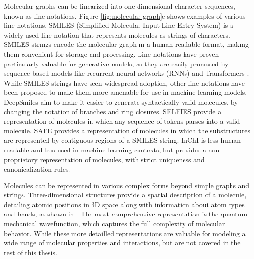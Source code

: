 Molecular graphs can be linearized into one-dimensional character sequences, known as line
notations. Figure \ref{fig:molecular-graph}c shows examples of various line notations. SMILES
(Simplified Molecular Input Line Entry System) \citep{weiningerSMILESChemicalLanguage1988} is a
widely used line notation that represents molecules as strings of characters. SMILES strings encode
the molecular graph in a human-readable format, making them convenient for storage and processing.
Line notations have proven particularly valuable for generative models, as they are easily processed
by sequence-based models like recurrent neural networks (RNNs) and Transformers
\citep{vaswaniAttentionAllYou2017}. While SMILES strings have seen widespread adoption,
other line notations have been proposed to make them
more amenable for use in machine learning models. DeepSmiles
\citep{oboyleDeepSMILESAdaptationSMILES2018} aim to make it easier to generate syntactically
valid molecules, by changing the notation of branches and ring closures. SELFIES
\citep{krennSELFIESFutureMolecular2022} provide a representation of molecules in which any sequence
of tokens parses into a valid molecule. SAFE \citep{noutahiGottaBeSAFE2023} provides a
representation of molecules in which the substructures are represented by contiguous regions of a
SMILES string. InChI \citep{hellerInChIIUPACInternational2015} is less human-readable and less used
in machine learning contexts, but provides a non-proprietory representation of molecules, with
strict uniqueness and canonicalization rules.

Molecules can be represented in various complex forms beyond simple graphs and strings.
Three-dimensional structures provide a spatial description of a molecule, detailing atomic positions
in 3D space along with information about atom types and bonds, as shown in
. The most comprehensive representation is the quantum mechanical
wavefunction, which captures the full complexity of molecular behavior. While these more
detailled representations are valuable for modeling a wide range of molecular properties and
interactions, but are not covered in the rest of this thesis.

